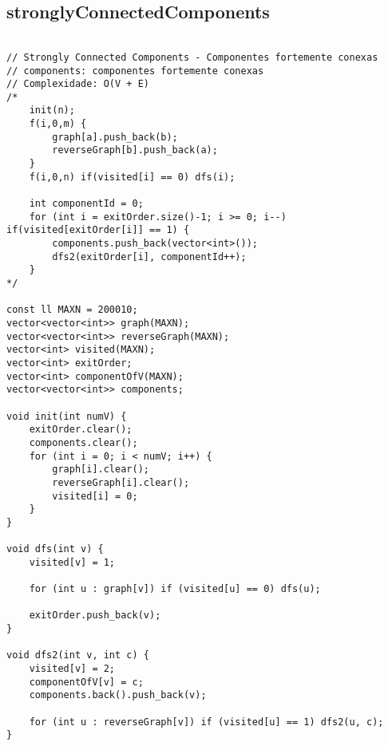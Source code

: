 \documentclass[landscape,twocolumn,10pt,a4paper]{article}
\begin{document}
\subsection{stronglyConnectedComponents}
\begin{verbatim}

// Strongly Connected Components - Componentes fortemente conexas
// components: componentes fortemente conexas
// Complexidade: O(V + E)
/*
    init(n);
    f(i,0,m) {
        graph[a].push_back(b);
        reverseGraph[b].push_back(a);
    }
    f(i,0,n) if(visited[i] == 0) dfs(i);

    int componentId = 0;
    for (int i = exitOrder.size()-1; i >= 0; i--) if(visited[exitOrder[i]] == 1) {
        components.push_back(vector<int>());
        dfs2(exitOrder[i], componentId++);
    }
*/

const ll MAXN = 200010;
vector<vector<int>> graph(MAXN);
vector<vector<int>> reverseGraph(MAXN);
vector<int> visited(MAXN);
vector<int> exitOrder;
vector<int> componentOfV(MAXN);
vector<vector<int>> components;

void init(int numV) {
    exitOrder.clear();
    components.clear();
    for (int i = 0; i < numV; i++) {
        graph[i].clear();
        reverseGraph[i].clear();
        visited[i] = 0;
    }
}

void dfs(int v) {
    visited[v] = 1;

    for (int u : graph[v]) if (visited[u] == 0) dfs(u);

    exitOrder.push_back(v);
}

void dfs2(int v, int c) {
    visited[v] = 2;
    componentOfV[v] = c;
    components.back().push_back(v);

    for (int u : reverseGraph[v]) if (visited[u] == 1) dfs2(u, c);
}


\end{verbatim}
\end{document}
